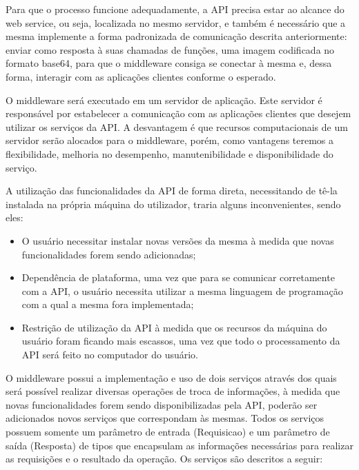 \documentclass[12pt]{article}
\begin{document}
Para que o processo funcione adequadamente, a API precisa estar ao alcance do web service, ou seja, localizada no mesmo servidor, e também é necessário que a mesma implemente a forma padronizada de comunicação descrita anteriormente: enviar como resposta à suas chamadas de funções, uma imagem codificada no formato base64, para que o
middleware consiga se conectar à mesma e, dessa forma, interagir com as aplicações clientes conforme o esperado.

O middleware será executado em um servidor de aplicação. Este servidor
é responsável por estabelecer a comunicação com as aplicações clientes que desejem utilizar os serviços da API. 
A desvantagem é que recursos computacionais de um servidor serão alocados para o middleware, porém, como vantagens teremos a flexibilidade, melhoria no desempenho, manutenibilidade e disponibilidade do serviço.

A utilização das funcionalidades da API de forma direta, necessitando de tê-la instalada na própria máquina do utilizador, traria alguns inconvenientes, sendo eles:
\begin{itemize}
	\item O usuário necessitar instalar novas versões da mesma à medida que novas funcionalidades forem sendo adicionadas;
	\item Dependência de plataforma, uma vez que para se comunicar corretamente com a API, o usuário necessita utilizar a mesma linguagem de programação com a qual a mesma fora implementada;
	\item Restrição de utilização da API à medida que os recursos da máquina do usuário foram ficando mais escassos, uma vez que todo o processamento da API será feito no computador do usuário.
\end{itemize}

O middleware possui a implementação e uso de dois serviços através dos quais será possível realizar diversas operações de troca de informações, à medida que novas funcionalidades forem sendo disponibilizadas pela API, poderão ser adicionados novos serviços que correspondam às mesmas.
Todos os serviços possuem somente um parâmetro de entrada (Requisicao) e um parâmetro de saída (Resposta) de tipos que encapsulam as informações necessárias para realizar as requisições e o resultado da operação. Os serviços são descritos a seguir:

\end{document}
